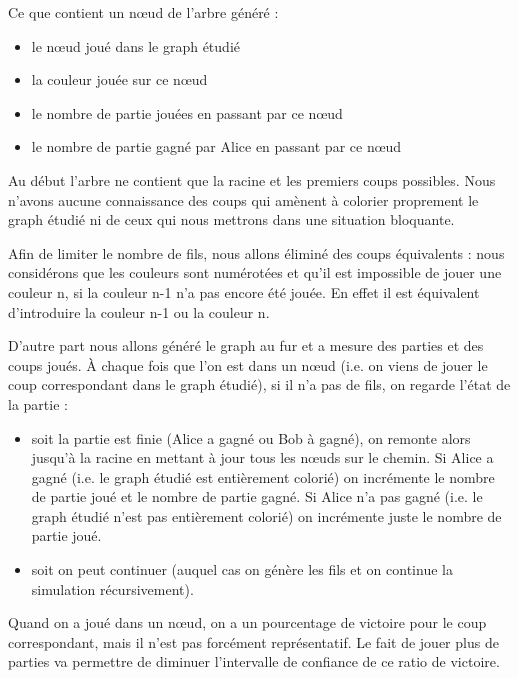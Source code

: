 Ce que contient un nœud de l’arbre généré : 
\begin{itemize}
\item le nœud joué dans le graph étudié
\item la couleur jouée sur ce nœud 
\item le nombre de partie jouées en passant par ce nœud 
\item le nombre de partie gagné par Alice en passant par ce nœud
\end{itemize}

Au début l’arbre ne contient que la racine et les premiers coups possibles. Nous n’avons aucune connaissance des coups qui amènent à colorier proprement le graph étudié ni de ceux qui nous mettrons  dans une situation bloquante. 

Afin de limiter le nombre de fils, nous allons éliminé des coups équivalents : nous considérons que les couleurs sont numérotées et qu’il est impossible de jouer une couleur n, si la couleur n-1 n’a pas encore été jouée. En effet il est équivalent d’introduire la couleur n-1 ou la couleur n. 

D’autre part nous allons généré le graph au fur et a mesure des parties et des coups joués. À chaque fois que l’on est dans un nœud (i.e. on viens de jouer le coup correspondant dans le graph étudié), si il n’a pas de fils, on regarde l'état de la partie : 
\begin{itemize}
\item soit la partie est finie (Alice a gagné ou Bob à gagné), on remonte alors jusqu’à la racine en mettant à jour tous les nœuds sur le chemin. Si Alice a gagné (i.e. le graph étudié est entièrement colorié) on incrémente le nombre de partie joué et le nombre de partie gagné. Si Alice n’a pas gagné (i.e. le graph étudié n’est pas entièrement colorié)  on incrémente juste le nombre de partie joué.
\item soit on peut continuer (auquel cas on génère les fils et on continue la simulation récursivement).
\end{itemize}
Quand on a joué dans un nœud, on a un pourcentage de victoire pour le coup correspondant, mais il n’est pas forcément représentatif. Le fait de jouer plus de parties va permettre de diminuer l'intervalle de confiance de ce ratio de victoire.

